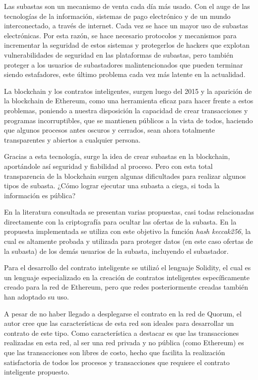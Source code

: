 \begin{conclusions}
    Las subastas son un mecanismo de venta cada día más usado. Con el auge de las tecnologías de la 
    información, sistemas de pago electrónico y de un mundo interconectado, a través de internet. Cada
    vez se hace un mayor uso de subastas electrónicas. Por esta razón, se hace necesario protocolos y 
    mecanismos para incrementar la seguridad de estos sistemas y protegerlos de hackers que explotan
    vulnerabilidades de seguridad en las plataformas de subastas, pero también proteger a los usuarios
    de subastadores malintencionados que pueden terminar siendo estafadores, este último problema cada
    vez más latente en la actualidad.

    La blockchain y los contratos inteligentes, surgen luego del 2015 y la aparición de la blockchain de 
    Ethereum, como
    una herramienta eficaz para hacer frente a estos problemas, poniendo a nuestra disposición la 
    capacidad de crear transacciones y programas incorruptibles, que se mantienen públicos a la vista 
    de todos, haciendo que algunos procesos antes oscuros y cerrados, sean ahora totalmente transparentes
    y abiertos a cualquier persona.

    Gracias a esta tecnología, surge la idea de crear subastas en la blockchain, aportándole así seguridad
    y fiabilidad al proceso. Pero con esta total transparencia de la blockchain surgen algunas dificultades
    para realizar algunos tipos de subasta. ¿Cómo lograr ejecutar una subasta a ciega, si toda la información
    es pública?

    En la literatura consultada se presentan varias propuestas, casi todas relacionadas directamente
    con la criptografía para ocultar las ofertas de la subasta. En la propuesta implementada se utiliza con
    este objetivo la función \textit{hash keccak256}, la cual es altamente probada y utilizada para 
    proteger datos (en este caso ofertas de la subasta) de los demás usuarios de la subasta, incluyendo 
    el subastador.

    Para el desarrollo del contrato inteligente se utilizó el lenguaje Solidity, el cual es un lenguaje
    especializado en la creación de contratos inteligentes específicamente creado para la red de 
    Ethereum, pero que redes posteriormente creadas también han adoptado su uso.

    A pesar de no haber llegado a desplegarse el contrato en la red de Quorum, el autor cree que las
    características de esta red son ideales para desarrollar un contrato de este tipo. Como característica
    a destacar es que las transacciones realizadas en esta red, al ser una red privada y no pública (como 
    Ethereum) es que las transacciones son libres de costo, hecho que facilita la realización satisfactoria
    de todos los procesos y transacciones que requiere el contrato inteligente propuesto.


\end{conclusions}
